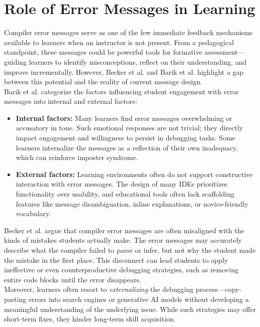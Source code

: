 \section{Role of Error Messages in Learning} %

Compiler error messages serve as one of the few immediate feedback mechanisms available to learners when an instructor is not present.
From a pedagogical standpoint, these messages could be powerful tools for formative assessment—guiding learners to identify misconceptions, reflect on their understanding, and improve incrementally.
However, Becker et al. \cite{becker} and Barik et al. \cite{barik} highlight a gap between this potential and the reality of current message design.\\[5pt]
\noindent Barik et al. categorize the factors influencing student engagement with error messages into internal and external factors:

\begin{itemize}
    \item \textbf{Internal factors:} Many learners find error messages overwhelming or accusatory in tone.
        Such emotional responses are not trivial; they directly impact engagement and willingness to persist in debugging tasks.
        Some learners internalize the messages as a reflection of their own inadequacy, which can reinforce imposter syndrome.
    \item \textbf{External factors:} Learning environments often do not support constructive interaction with error messages.
        The design of many IDEs prioritizes functionality over usability, and educational tools often lack scaffolding features like message disambiguation,
        inline explanations, or novice-friendly vocabulary.
\end{itemize}

\noindent Becker et al. argue that compiler error messages are often misaligned with the kinds of mistakes students actually make.
The error messages may accurately describe what the compiler failed to parse or infer, but not why the student made the mistake in the first place.
This disconnect can lead students to apply ineffective or even counterproductive debugging strategies, such as removing entire code blocks until the error disappears.\\[5pt]
\noindent Moreover, learners often resort to \textit{externalizing} the debugging process—copy-pasting errors into search engines or
generative AI models without developing a meaningful understanding of the underlying issue.
While such strategies may offer short-term fixes, they hinder long-term skill acquisition.

